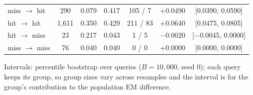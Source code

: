 \begin{table}[t]
\begin{tabular}{lcccccc}
\quad miss $\to$ hit & 290 & 0.079 & 0.417 & 105 / 7 & +0.0490 & [0.0390, 0.0590] \\
\quad hit $\to$ hit & 1,611 & 0.350 & 0.429 & 211 / 83 & +0.0640 & [0.0475, 0.0805] \\
\quad hit $\to$ miss & 23 & 0.217 & 0.043 & 1 / 5 & \ensuremath{-}0.0020 & [\ensuremath{-}0.0045, 0.0000] \\
\quad miss $\to$ miss & 76 & 0.040 & 0.040 & 0 / 0 & +0.0000 & [0.0000, 0.0000] \\
\bottomrule
\end{tabular}
\par\smallskip\parbox{\linewidth}{\footnotesize Intervals: percentile bootstrap over queries ($B=10{,}000$, seed 0); each query keeps its group, so group sizes vary across resamples and the interval is for the group's contribution to the population EM difference.}
\end{table}
